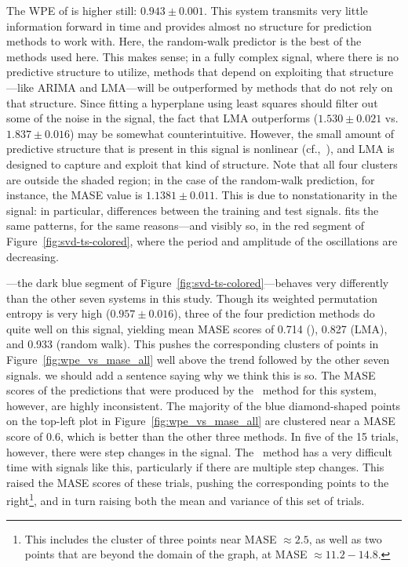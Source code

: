 The WPE of \gcc is higher still: $0.943 \pm 0.001$.  This system
transmits very little information forward in time and provides almost
no structure for prediction methods to work with.  Here, the
random-walk predictor is the best of the methods used here.  This
makes sense; in a fully complex signal, where there is no predictive
structure to utilize, methods that depend on exploiting that
structure---like ARIMA and LMA---will be outperformed by methods that
do not rely on that structure.
% 
%
Since fitting a hyperplane using least squares should filter out some
of the noise in the signal, the fact that LMA outperforms \arima
($1.530 \pm 0.021$ vs. $1.837 \pm 0.016$) may be somewhat
counterintuitive.  However, the small amount of predictive structure
that is present in this signal is nonlinear (cf.,~\cite{mytkowicz09}),
and LMA is designed to capture and exploit that kind of structure.
Note that all four \gcc clusters are outside the shaded region; in the
case of the random-walk prediction, for instance, the MASE value is
$1.1381 \pm 0.011$.  This is due to nonstationarity in the signal: in
particular, differences between the training and test signals.
\svdtwo fits the same patterns, for the same reasons---and visibly so,
in the red segment of Figure~\ref{fig:svd-ts-colored}, where the
period and amplitude of the oscillations are decreasing.

\svdone---the dark blue segment of
Figure~\ref{fig:svd-ts-colored}---behaves very differently than the
other seven systems in this study.  Though its weighted permutation
entropy is very high ($0.957 \pm 0.016$), three of the four prediction
methods do quite well on this signal, yielding mean MASE scores of
0.714 (\arima), 0.827 (LMA), and 0.933 (random walk).  This pushes the
corresponding clusters of points in Figure~\ref{fig:wpe_vs_mase_all}
well above the trend followed by the other seven signals.  \alert{we
  should add a sentence saying why we think this is so.}  The MASE
scores of the predictions that were produced by the \naive ~method for
this system, however, are highly inconsistent.  The majority of the
blue diamond-shaped points on the top-left plot in
Figure~\ref{fig:wpe_vs_mase_all} are clustered near a MASE score of
0.6, which is better than the other three methods.  In five of the 15
\svdone trials, however, there were step changes in the signal.  The
\naive ~method has a very difficult time with signals like this,
particularly if there are multiple step changes.  This raised the MASE
scores of these trials, pushing the corresponding points to the
right\footnote{This includes the cluster of three points near MASE
  $\approx 2.5$, as well as two points that are beyond the domain of
  the graph, at MASE $\approx 11.2-14.8$.}, and in turn raising both
the mean and variance of this set of trials.

